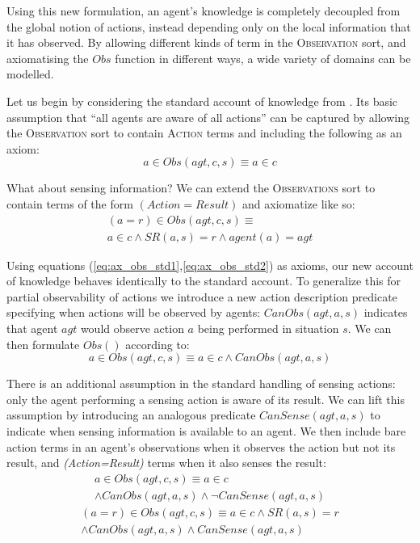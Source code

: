 \documentclass{ifaamas-submission}
\newcommand{\noun}[1]{\textsc{#1}}
\begin{document}
Using this new formulation, an agent's knowledge is completely decoupled
from the global notion of actions, instead depending only on the local
information that it has observed. By allowing different kinds of term in
the \noun{Observation} sort, and axiomatising the $Obs$ function in
different ways, a wide variety of domains can be modelled.

Let us begin by considering the standard account of knowledge from
\cite{scherl03sc_knowledge}. Its basic assumption that {}``all agents
are aware of all actions'' can be captured by allowing the \noun{Observation}
sort to contain \noun{Action} terms and including the following as an axiom:
\begin{equation}
a\in Obs(agt,c,s)\equiv a\in c\label{eq:ax_obs_std1}
\end{equation}

What about sensing information? We can extend the \noun{Observations}
sort to contain terms of the form \emph{$(Action=Result)$} and axiomatize
like so:
\begin{multline}
(a=r)\in Obs(agt,c,s)\equiv\\
a\in c\wedge SR(a,s)=r\wedge agent(a)=agt\label{eq:ax_obs_std2}
\end{multline}

Using equations (\ref{eq:ax_obs_std1},\ref{eq:ax_obs_std2}) as axioms, 
our new account of knowledge behaves
identically to the standard account.
To generalize this for partial observability of actions we introduce
a new action description predicate specifying
when actions will be observed by agents: $CanObs(agt,a,s)$ indicates
that agent $agt$ would observe action $a$ being performed in situation
$s$. We can then formulate $Obs()$ according to:
\begin{equation*}
a\in Obs(agt,c,s)\equiv a\in c\wedge CanObs(agt,a,s)
\end{equation*}

There is an additional assumption in the standard handling of sensing
actions: only the agent performing a sensing action is aware of its
result. We can lift this assumption by introducing an analogous
predicate $CanSense(agt,a,s)$ to indicate when sensing information
is available to an agent. We then include bare action terms in an
agent's observations when it observes the action but not its result,
and \emph{(Action=Result)} terms when it also senses the result:
\begin{multline*}
a\in Obs(agt,c,s)\equiv a\in c\\
\wedge CanObs(agt,a,s)\wedge\neg CanSense(agt,a,s)\end{multline*}
\begin{multline*}
(a=r)\in Obs(agt,c,s)\equiv a\in c\wedge SR(a,s)=r\\
\wedge CanObs(agt,a,s)\wedge CanSense(agt,a,s)
\end{multline*}
\end{document}
